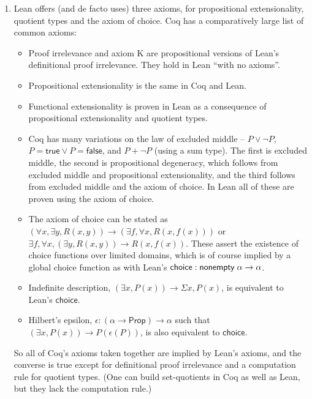 \begin{enumerate}
\item Lean offers (and de facto uses) three axioms, for propositional extensionality, quotient types and the axiom of choice. Coq has a comparatively large list of common axioms:
\begin{itemize}
  \item Proof irrelevance and axiom K are propositional versions of Lean's definitional proof irrelevance. They hold in Lean ``with no axioms''.
  \item Propositional extensionality is the same in Coq and Lean.
  \item Functional extensionality is proven in Lean as a consequence of propositional extensionality and quotient types.
  \item Coq has many variations on the law of excluded middle -- $P\lor\neg P$, $P=\mathsf{true}\lor P=\mathsf{false}$, and $P+\neg P$ (using a sum type). The first is excluded middle, the second is propositional degeneracy, which follows from excluded middle and propositional extensionality, and the third follows from excluded middle and the axiom of choice. In Lean all of these are proven using the axiom of choice.
  \item The axiom of choice can be stated as $(\forall x,\exists y,R(x,y))\to(\exists f,\forall x,R(x,f(x)))$ or\\
  $\exists f,\forall x,(\exists y,R(x,y))\to R(x,f(x))$. These assert the existence of choice functions over limited domains, which is of course implied by a global choice function as with Lean's $\mathsf{choice}:\mathsf{nonempty}\;\alpha\to\alpha$.
  \item Indefinite description, $(\exists x, P(x))\to\Sigma x, P(x)$, is equivalent to Lean's $\mathsf{choice}$.
  \item Hilbert's epsilon, $\epsilon:(\alpha\to\mathsf{Prop})\to \alpha$ such that $(\exists x,P(x))\to P(\epsilon(P))$, is also equivalent to $\mathsf{choice}$.
\end{itemize}
So all of Coq's axioms taken together are implied by Lean's axioms, and the converse is true except for definitional proof irrelevance and a computation rule for quotient types. (One can build set-quotients in Coq as well as Lean, but they lack the computation rule.)
\end{enumerate}
